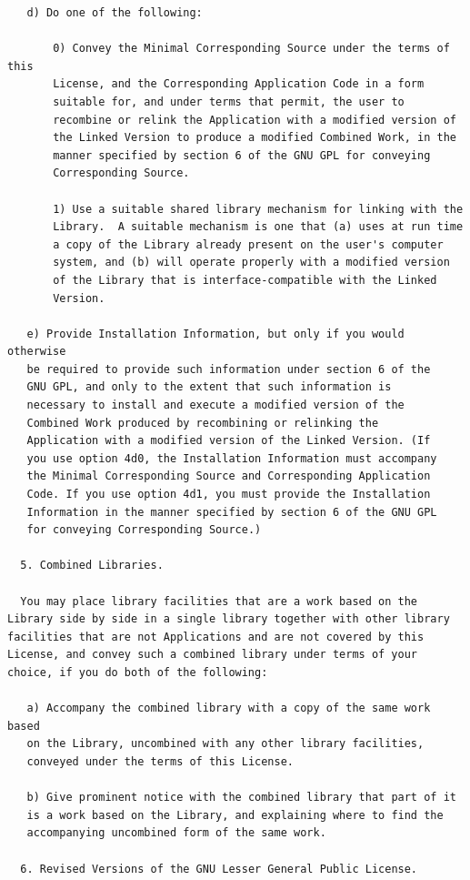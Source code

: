 \documentclass[10pt, headsepline,DIV14,BCOR0.5cm]{scrreprt}
\begin{document}
\begin{lstlisting}
   d) Do one of the following:

       0) Convey the Minimal Corresponding Source under the terms of this
       License, and the Corresponding Application Code in a form
       suitable for, and under terms that permit, the user to
       recombine or relink the Application with a modified version of
       the Linked Version to produce a modified Combined Work, in the
       manner specified by section 6 of the GNU GPL for conveying
       Corresponding Source.

       1) Use a suitable shared library mechanism for linking with the
       Library.  A suitable mechanism is one that (a) uses at run time
       a copy of the Library already present on the user's computer
       system, and (b) will operate properly with a modified version
       of the Library that is interface-compatible with the Linked
       Version.

   e) Provide Installation Information, but only if you would otherwise
   be required to provide such information under section 6 of the
   GNU GPL, and only to the extent that such information is
   necessary to install and execute a modified version of the
   Combined Work produced by recombining or relinking the
   Application with a modified version of the Linked Version. (If
   you use option 4d0, the Installation Information must accompany
   the Minimal Corresponding Source and Corresponding Application
   Code. If you use option 4d1, you must provide the Installation
   Information in the manner specified by section 6 of the GNU GPL
   for conveying Corresponding Source.)

  5. Combined Libraries.

  You may place library facilities that are a work based on the
Library side by side in a single library together with other library
facilities that are not Applications and are not covered by this
License, and convey such a combined library under terms of your
choice, if you do both of the following:

   a) Accompany the combined library with a copy of the same work based
   on the Library, uncombined with any other library facilities,
   conveyed under the terms of this License.

   b) Give prominent notice with the combined library that part of it
   is a work based on the Library, and explaining where to find the
   accompanying uncombined form of the same work.

  6. Revised Versions of the GNU Lesser General Public License.


\end{lstlisting}
\end{document}
